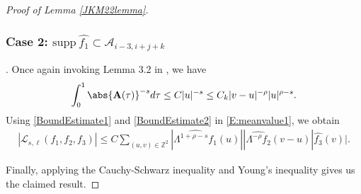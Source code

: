 \documentclass[twoside, reqno]{amsart}
\numberwithin{lemma}{section}
\numberwithin{theorem}{section}
\numberwithin{proposition}{section}
\numberwithin{equation}{section} %
\newcommand{\Lam}{\Lambda}
\begin{document}
\begin{proof}[Proof of Lemma \ref{JKM22lemma}]
\subsubsection*{Case 2: $\text{supp} \ \widehat{f_1}\subset \mathcal{A}_{i-3,i+j+k}$}. Once again invoking Lemma 3.2 in \cite{JKM2022}, we have 
\begin{align}\label{BoundEstimate2}
    \int_{0}^{1}\abs{\mathbf{A}(\tau)}^{-s}d\tau \le C|u|^{-s}\le C_k |v-u|^{-\rho}|u|^{\rho-s}.
\end{align}
Using \eqref{BoundEstimate1} and \eqref{BoundEstimate2} in \eqref{E:meanvalue1}, we obtain
\begin{align*}
    |\mathcal{L}_{s,\ell}(f_1,f_2,f_3)|\le C \sum_{(u,v)\in \mathbb{Z}^2}|\widehat{\Lam^{1+\rho-s}f_1}(u)||\widehat{\Lam^{-\rho}f_2}(v-u)|{\widehat{f_3}(v)}|.
\end{align*}

Finally, applying the Cauchy-Schwarz inequality and Young's inequality gives us the claimed result.

\end{proof}


 
\end{document}
